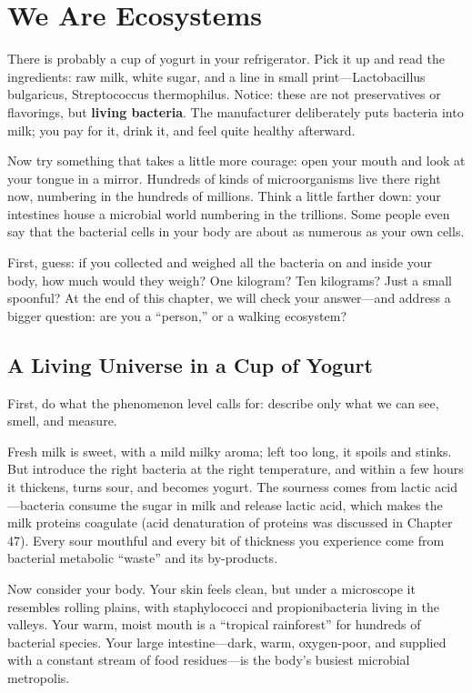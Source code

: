 \chapter{We Are Ecosystems}

\begin{kaichang}
There is probably a cup of yogurt in your refrigerator. Pick it up and read the ingredients: raw milk, white sugar, and a line in small print---Lactobacillus bulgaricus, Streptococcus thermophilus. Notice: these are not preservatives or flavorings, but \textbf{living bacteria}. The manufacturer deliberately puts bacteria into milk; you pay for it, drink it, and feel quite healthy afterward.

Now try something that takes a little more courage: open your mouth and look at your tongue in a mirror. Hundreds of kinds of microorganisms live there right now, numbering in the hundreds of millions. Think a little farther down: your intestines house a microbial world numbering in the trillions. Some people even say that the bacterial cells in your body are about as numerous as your own cells.

First, guess: if you collected and weighed all the bacteria on and inside your body, how much would they weigh? One kilogram? Ten kilograms? Just a small spoonful? At the end of this chapter, we will check your answer---and address a bigger question: are you a ``person,'' or a walking ecosystem?
\end{kaichang}

\section{A Living Universe in a Cup of Yogurt}

First, do what the phenomenon level calls for: describe only what we can see, smell, and measure.

Fresh milk is sweet, with a mild milky aroma; left too long, it spoils and stinks. But introduce the right bacteria at the right temperature, and within a few hours it thickens, turns sour, and becomes yogurt. The sourness comes from lactic acid---bacteria consume the sugar in milk and release lactic acid, which makes the milk proteins coagulate (acid denaturation of proteins was discussed in Chapter 47). Every sour mouthful and every bit of thickness you experience come from bacterial metabolic ``waste'' and its by-products.

Now consider your body. Your skin feels clean, but under a microscope it resembles rolling plains, with staphylococci and propionibacteria living in the valleys. Your warm, moist mouth is a ``tropical rainforest'' for hundreds of bacterial species. Your large intestine---dark, warm, oxygen-poor, and supplied with a constant stream of food residues---is the body's busiest microbial metropolis.

